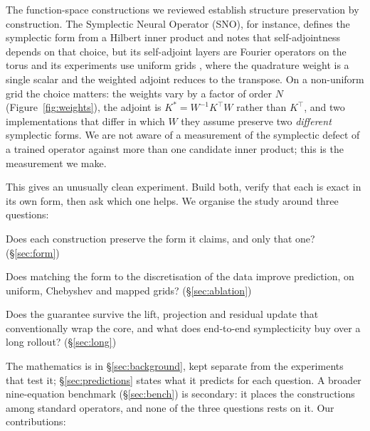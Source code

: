 \documentclass[11pt]{article}
\theoremstyle{definition}
\theoremstyle{remark}
\begin{document}
The function-space constructions we reviewed establish structure preservation
by construction. The Symplectic Neural Operator (SNO), for instance, defines the
symplectic form from a Hilbert inner product and notes that self-adjointness
depends on that choice, but its
self-adjoint layers are Fourier operators on the torus and its experiments use
uniform grids \citep{makara2026sno}, where the quadrature weight is a single
scalar and the weighted adjoint reduces to the transpose. On a non-uniform grid
the choice matters: the weights vary by a factor of order $N$
(Figure~\ref{fig:weights}), the adjoint is $K^{*}=W^{-1}K^{\top}W$ rather than
$K^{\top}$, and two implementations that differ in which $W$ they assume
preserve two \emph{different} symplectic forms. We are not aware of a
measurement of the symplectic defect of a trained operator against more than one
candidate inner product; this is the measurement we make.

This gives an unusually clean experiment. Build both, verify that each is exact
in its own form, then ask which one helps. We organise the study around three
questions:

\begin{description}\itemsep2pt
\item[RQ1.] Does each construction preserve the form it claims, and only that
one? (\S\ref{sec:form})
\item[RQ2.] Does matching the form to the discretisation of the data improve
prediction, on uniform, Chebyshev and mapped grids? (\S\ref{sec:ablation})
\item[RQ3.] Does the guarantee survive the lift, projection and residual update
that conventionally wrap the core, and what does end-to-end symplecticity buy
over a long rollout? (\S\ref{sec:long})
\end{description}

The mathematics is in \S\ref{sec:background}, kept separate from the experiments
that test it; \S\ref{sec:predictions} states what it predicts for each question.
A broader nine-equation benchmark (\S\ref{sec:bench}) is secondary: it places
the constructions among standard operators, and none of the three questions
rests on it. Our contributions:
\end{document}
